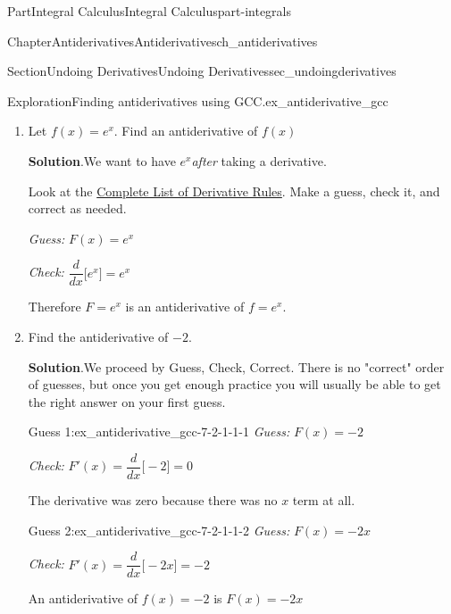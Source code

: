 \documentclass[oneside,10pt,]{tufte-book}
\newcommand{\blocktitlefont}{\relax}
\newcommand{\alert}[1]{\textbf{\textit{#1}}}
\numberwithin{equation}{chapter}
\newcommand{\ddx}[1]{ \dfrac{d}{dx} \Big[ #1 \Big]  }
\begin{document}
\begin{partptx}{Part}{Integral Calculus}{}{Integral Calculus}{}{}{part-integrals}
\begin{chapterptx}{Chapter}{Antiderivatives}{}{Antiderivatives}{}{}{ch_antiderivatives}
\begin{sectionptx}{Section}{Undoing Derivatives}{}{Undoing Derivatives}{}{}{sec_undoingderivatives}
\begin{exploration}{Exploration}{Finding antiderivatives using GCC.}{ex_antiderivative_gcc}
\begin{enumerate}[font=\bfseries,label=(\alph*),ref=\alph*]
\par
Look at the \hyperref[assemblage-derivativesummary]{Complete List of Derivative Rules}. Make a guess, check it, and correct as needed.%
\par
\emph{Guess:} \(F(x) = \ln(x)\)%
\par
\emph{Check:} \(\ddx{\ln(x)} = \frac{1}{x}\)%
\par
\alert{Important:} For technical reasons beyond the scope of this course, we actually need to place absolute values around the input to \(\ln(x)\)%
\par
Therefore \(F= \ln(|x|)\) is an antiderivative of \(f=\frac{1}{x}\).%
\item{}Let \(f(x) = e^x\).  Find an antiderivative of \(f(x)\)%
\par\smallskip%
\noindent\textbf{\blocktitlefont Solution}.\hypertarget{ex_antiderivative_gcc-6-2}{}\quad{}We want to have \(e^x\)\emph{after} taking a derivative.%
\par
Look at the \hyperref[assemblage-derivativesummary]{Complete List of Derivative Rules}. Make a guess, check it, and correct as needed.%
\par
\emph{Guess:} \(F(x) = e^x\)%
\par
\emph{Check:} \(\ddx{ e^x } = e^x \)%
\par
Therefore \(F= e^x \) is an antiderivative of \(f=e^x \).%
\item{}Find the antiderivative of \(-2\).%
\par\smallskip%
\noindent\textbf{\blocktitlefont Solution}.\hypertarget{ex_antiderivative_gcc-7-2}{}\quad{}We proceed by Guess, Check, Correct. There is no "correct" order of guesses, but once you get enough practice you will usually be able to get the right answer on your first guess.%
\begin{descriptionlist}
\begin{dlimedium}{Guess 1:}{ex_antiderivative_gcc-7-2-1-1-1}%
\emph{Guess:} \(F(x) = -2\)%
\par
\emph{Check:} \(F'(x) = \ddx{-2} = 0\)%
\par
The derivative was zero because there was no \(x\) term at all.%
\end{dlimedium}%
\begin{dlimedium}{Guess 2:}{ex_antiderivative_gcc-7-2-1-1-2}%
\emph{Guess:} \(F(x) = -2x\)%
\par
\emph{Check:} \(F'(x) = \ddx{-2x} = -2\)%
\par
An antiderivative of \(f(x)=-2\) is \(F(x)=-2x\)%
\end{dlimedium}%

\end{descriptionlist}
\end{enumerate}
\end{exploration}
\end{sectionptx}
\end{chapterptx}
\end{partptx}
\end{document}
